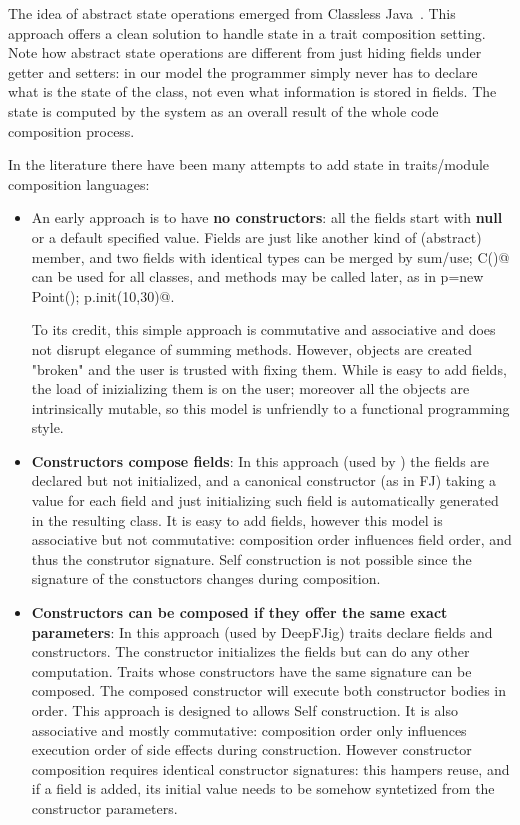 The idea of abstract state operations emerged from Classless
Java~\cite{wang2016classless}. This approach offers a clean solution to handle state
in a trait composition setting.
Note how abstract state operations are different from just hiding fields under getter and setters: 
in our model the programmer simply never has to declare what is the state of the class, not even what information is stored in fields.
The state is computed by the system as an overall result of the whole code composition process.

In the literature there have been many attempts to add state in traits/module composition languages:
\begin{itemize}  
\item An early approach is to have {\bf no constructors}: all the fields start with {\bf null} or a default specified value.
  Fields are just like another kind of (abstract) member, and two fields
  with identical types can be merged by sum/use; \Q@new C()@ can be used for all classes, and \Q@init@ methods may be called later, as in
  \Q@Point p=new Point(); p.init(10,30)@.
  
  To its credit, this simple approach is commutative and associative and does not disrupt elegance of summing methods.
  However, objects are created "broken" and the user is trusted with fixing them.
  While is easy to add fields, the load of inizializing them is on the user; moreover
    all the objects are intrinsically mutable, so this model is unfriendly
    to a functional programming style.
\item {\bf Constructors compose fields}:
In this approach (used by \cite{fjig}) the fields are declared but not initialized, and
a canonical constructor (as in FJ) taking a value for each field and just initializing such field
is automatically generated in the resulting class.
It is easy to add fields, however this model is associative but not commutative: composition order influences field order, and thus the construtor signature.
Self construction is not possible 
since the signature of the constuctors changes during composition.

\item {\bf Constructors can be composed if they offer the same exact parameters}:
In this approach (used by DeepFJig) traits declare fields and constructors.
The constructor initializes the fields but can do any other computation.
Traits whose constructors have the same signature can be composed.
The composed constructor will execute both constructor bodies in order.
This approach is designed to allows Self construction.
It is also associative and mostly commutative: composition order only influences execution order of side effects during construction.
However constructor composition requires identical constructor signatures: this
hampers reuse, and if a field is added, its initial value needs to be
somehow syntetized from the constructor parameters.

\end{itemize}

